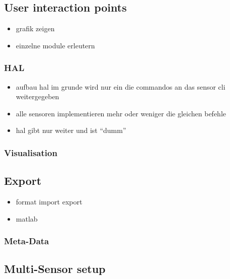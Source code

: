 \hypertarget{user-interaction-points}{%
\subsection{User interaction points}\label{user-interaction-points}}

\begin{itemize}
\tightlist
\item
  grafik zeigen
\item
  einzelne module erleutern
\end{itemize}

\hypertarget{hal}{%
\subsubsection{HAL}\label{hal}}

\begin{itemize}
\tightlist
\item
  aufbau hal im grunde wird nur ein die commandos an das sensor cli
  weitergegeben
\item
  alle sensoren implementieren mehr oder weniger die gleichen befehle
\item
  hal gibt nur weiter und ist ``dumm''
\end{itemize}

\hypertarget{visualisation}{%
\subsubsection{Visualisation}\label{visualisation}}

\hypertarget{export}{%
\subsection{Export}\label{export}}

\begin{itemize}
\tightlist
\item
  format import export
\item
  matlab
\end{itemize}

\hypertarget{meta-data}{%
\subsubsection{Meta-Data}\label{meta-data}}

\hypertarget{multi-sensor-setup}{%
\subsection{Multi-Sensor setup}\label{multi-sensor-setup}}

